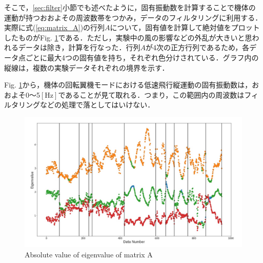

そこで，\ref{sec:filter}小節でも述べたように，固有振動数を計算することで機体の運動が持つおおよその周波数帯をつかみ，データのフィルタリングに利用する．実際に式(\ref{eq:matrix_A})の行列$A$について，固有値を計算して絶対値をプロットしたものがFig. \ref{fig:eigenvalue}である．ただし，実験中の風の影響などの外乱が大きいと思われるデータは除き，計算を行なった．行列$A$が4次の正方行列であるため，各データ点ごとに最大4つの固有値を持ち，それぞれ色分けされている．グラフ内の縦線は，複数の実験データそれぞれの境界を示す．

Fig. \ref{fig:eigenvalue}から，機体の回転翼機モードにおける低速飛行縦運動の固有振動数は，おおよそ0〜5$\mathrm{[Hz]}$であることが見て取れる．つまり，この範囲内の周波数はフィルタリングなどの処理で落としてはいけない．

\begin{figure}[H]
	\centering
	\includegraphics[clip,width=15.0cm,bb=0 0 1250 750]{./z_figure_files/chapter5/1_eigenvalue.jpeg}
	\caption{Absolute value of eigenvalue of matrix A}
	\label{fig:eigenvalue}
\end{figure}

